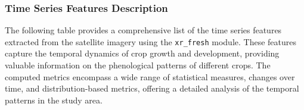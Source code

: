 \documentclass[
]{article}
\begin{document}
\hypertarget{time-series-features-description}{%
\subsubsection{Time Series Features
Description}\label{time-series-features-description}}

The following table provides a comprehensive list of the time series
features extracted from the satellite imagery using the
\texttt{xr\_fresh} module. These features capture the temporal dynamics
of crop growth and development, providing valuable information on the
phenological patterns of different crops. The computed metrics encompass
a wide range of statistical measures, changes over time, and
distribution-based metrics, offering a detailed analysis of the temporal
patterns in the study area.
\end{document}
